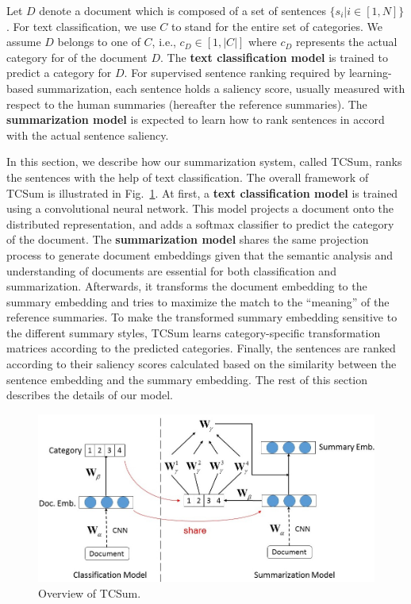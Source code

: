 \documentclass[letterpaper]{article}
\begin{document}
Let $D$ denote a document which is composed of a set of sentences $\{ {s_i}|i \in [1,N]\} $.
For text classification, we use $C$ to stand for the entire set of categories.
We assume $D$ belongs to one of $C$, i.e., $c_D \in [1,|C|]$ where $c_D$ represents the actual category for of the document $D$.
The \textbf{text classification model} is trained to predict a category for $D$.
For supervised sentence ranking required by learning-based summarization, each sentence holds a saliency score, usually measured with respect to the human summaries (hereafter the reference summaries).
The \textbf{summarization model} is expected to learn how to rank sentences in accord with the actual sentence saliency.



In this section, we describe how our summarization system, called TCSum, ranks the sentences with the help of text classification.
The overall framework of TCSum is illustrated in Fig.~\ref{fig:model}.
At first, a \textbf{text classification model} is trained using a convolutional neural network.
This model projects a document onto the distributed representation, and adds a softmax classifier to predict the category of the document.
The \textbf{summarization model} shares the same projection process to generate document embeddings given that the semantic analysis and understanding of documents are essential for both classification and summarization.
Afterwards, it transforms the document embedding to the summary embedding and tries to maximize the match to the ``meaning'' of the reference summaries.
To make the transformed summary embedding sensitive to the different summary styles, TCSum learns category-specific transformation matrices according to the predicted categories.
Finally, the sentences are ranked according to their saliency scores calculated based on the similarity between the sentence embedding and the summary embedding.
The rest of this section describes the details of our model.



\begin{figure}
\centering
\includegraphics[width=0.99\linewidth]{model}
\caption{Overview of TCSum.}
\label{fig:model}
\end{figure}
\end{document}
